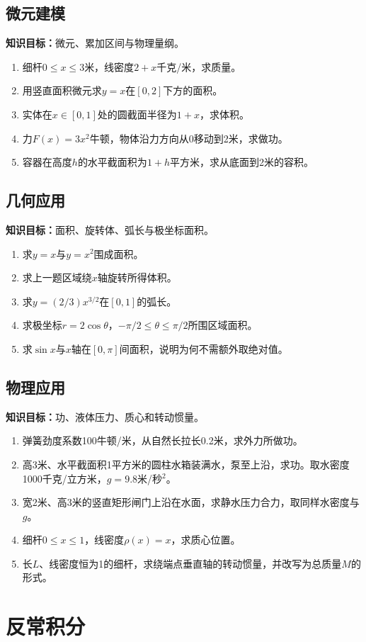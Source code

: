 \documentclass[11pt,a4paper,fontset=fandol]{ctexrep}
\newcommand{\goal}[1]{\textbf{知识目标：}#1\par}
\begin{document}
\subsection{微元建模}
\goal{微元、累加区间与物理量纲。}
\begin{enumerate}
\item 细杆$0\le x\le3$米，线密度$2+x$千克/米，求质量。
\item 用竖直面积微元求$y=x$在$[0,2]$下方的面积。
\item 实体在$x\in[0,1]$处的圆截面半径为$1+x$，求体积。
\item 力$F(x)=3x^2$牛顿，物体沿力方向从0移动到2米，求做功。
\item 容器在高度$h$的水平截面积为$1+h$平方米，求从底面到2米的容积。
\end{enumerate}
\subsection{几何应用}
\goal{面积、旋转体、弧长与极坐标面积。}
\begin{enumerate}
\item 求$y=x$与$y=x^2$围成面积。
\item 求上一题区域绕$x$轴旋转所得体积。
\item 求$y=(2/3)x^{3/2}$在$[0,1]$的弧长。
\item 求极坐标$r=2\cos\theta$，$-\pi/2\le\theta\le\pi/2$所围区域面积。
\item 求$\sin x$与$x$轴在$[0,\pi]$间面积，说明为何不需额外取绝对值。
\end{enumerate}
\subsection{物理应用}
\goal{功、液体压力、质心和转动惯量。}
\begin{enumerate}
\item 弹簧劲度系数100牛顿/米，从自然长拉长0.2米，求外力所做功。
\item 高3米、水平截面积1平方米的圆柱水箱装满水，泵至上沿，求功。取水密度1000千克/立方米，$g=9.8$米/秒$^2$。
\item 宽2米、高3米的竖直矩形闸门上沿在水面，求静水压力合力，取同样水密度与$g$。
\item 细杆$0\le x\le1$，线密度$\rho(x)=x$，求质心位置。
\item 长$L$、线密度恒为1的细杆，求绕端点垂直轴的转动惯量，并改写为总质量$M$的形式。
\end{enumerate}
\section{反常积分}
\end{document}

